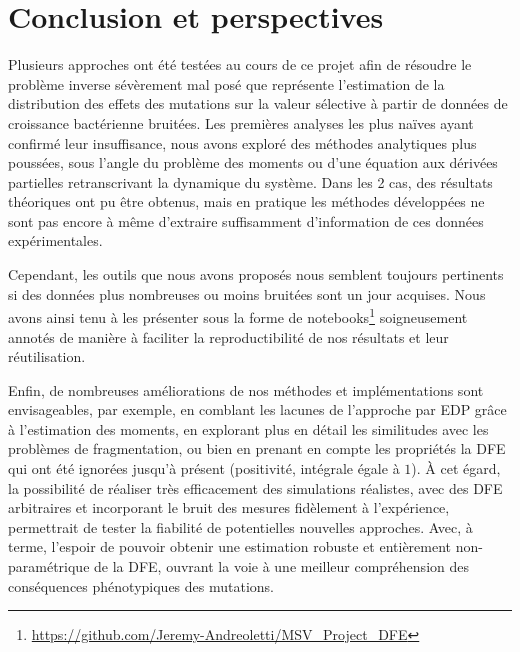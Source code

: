 \documentclass[12pt]{article}
\newcounter{prop}[section]
\begin{document}

\section{Conclusion et perspectives}

  Plusieurs approches ont été testées au cours de ce projet afin de résoudre le problème inverse sévèrement mal posé que représente l'estimation de la distribution des effets des mutations sur la valeur sélective à partir de données de croissance bactérienne bruitées. Les premières analyses les plus naïves ayant confirmé leur insuffisance, nous avons exploré des méthodes analytiques plus poussées, sous l'angle du problème des moments ou d'une équation aux dérivées partielles retranscrivant la dynamique du système. Dans les 2 cas, des résultats théoriques ont pu être obtenus, mais en pratique les méthodes développées ne sont pas encore à même d'extraire suffisamment d'information de ces données expérimentales.
  
  Cependant, les outils que nous avons proposés nous semblent toujours pertinents si des données plus nombreuses ou moins bruitées sont un jour acquises. Nous avons ainsi tenu à les présenter sous la forme de notebooks\footnote{\url{https://github.com/Jeremy-Andreoletti/MSV_Project_DFE}} soigneusement annotés de manière à faciliter la reproductibilité de nos résultats et leur réutilisation.
  
  Enfin, de nombreuses améliorations de nos méthodes et implémentations sont envisageables, par exemple, en comblant les lacunes de l'approche par EDP grâce à l'estimation des moments, en explorant plus en détail les similitudes avec les problèmes de fragmentation, ou bien en prenant en compte les propriétés la DFE qui ont été ignorées jusqu'à présent (positivité, intégrale égale à $1$). À cet égard, la possibilité de réaliser très efficacement des simulations réalistes, avec des DFE arbitraires et incorporant le bruit des mesures fidèlement à l'expérience, permettrait de tester la fiabilité de potentielles nouvelles approches. Avec, à terme, l'espoir de pouvoir obtenir une estimation robuste et entièrement non-paramétrique de la DFE, ouvrant la voie à une meilleur compréhension des conséquences phénotypiques des mutations.
\end{document}
